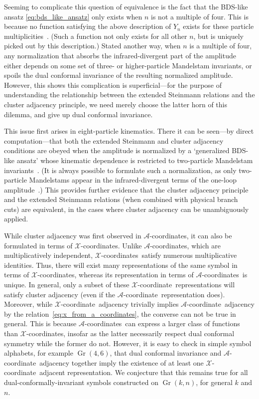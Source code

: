 \documentclass[12pt]{article}
\DeclareMathOperator{\Gr}{Gr}
\def\xcoord{$\mathcal{X}$-coordinate}
\def\xcoords{$\mathcal{X}$-coordinates}
\def\acoord{$\mathcal{A}$-coordinate}
\def\acoords{$\mathcal{A}$-coordinates}
\begin{document}
Seeming to complicate this question of equivalence is the fact that the BDS-like ansatz \eqref{eq:bds_like_ansatz} only exists when $n$ is not a multiple of four. This is because no function satisfying the above description of $Y_n$ exists for these particle multiplicities~\cite{Yang:2010az,Dixon:2016nkn}. (Such a function not only exists for all other $n$, but is uniquely picked out by this description.) Stated another way, when $n$ is a multiple of four, any normalization that absorbs the infrared-divergent part of the amplitude either depends on some set of three- or higher-particle Mandelstam invariants, or spoils the dual conformal invariance of the resulting normalized amplitude. However, this shows this complication is superficial---for the purpose of understanding the relationship between the extended Steinmann relations and the cluster adjacency principle, we need merely choose the latter horn of this dilemma, and give up dual conformal invariance. 

This issue first arises in eight-particle kinematics. There it can be seen---by direct computation---that both the extended Steinmann and cluster adjacency conditions are obeyed when the amplitude is normalized by a `generalized BDS-like ansatz' whose kinematic dependence is restricted to two-particle Mandelstam invariants~\cite{cluster_subalgebras_ii}. (It is always possible to formulate such a normalization, as only two-particle Mandelstams appear in the infrared-divergent terms of the one-loop amplitude~\cite{Bern:1994zx}.) This provides further evidence that the cluster adjacency principle and the extended Steinmann relations (when combined with physical branch cuts) are equivalent, in the cases where cluster adjacency can be unambiguously applied.

While cluster adjacency was first observed in \acoords, it can also be formulated in terms of \xcoords. Unlike \acoords, which are multiplicatively independent, \xcoords\ satisfy numerous multiplicative identities. Thus, there will exist many representations of the same symbol in terms of \xcoords, whereas its representation in terms of \acoords\ is unique. In general, only a subset of these \xcoord\ representations will satisfy cluster adjacency (even if the \acoord\ representation does). Moreover, while \xcoord\ adjacency trivially implies \acoord\ adjacency by the relation~\eqref{eq:x_from_a_coordinates}, the converse can not be true in general. This is because \acoords\ can express a larger class of functions than \xcoords, insofar as the latter necessarily respect dual conformal symmetry while the former do not. However, it is easy to check in simple symbol alphabets, for example $\Gr(4,6)$, that dual conformal invariance and \acoord\ adjacency together imply the existence of at least one \xcoord\ adjacent representation. We conjecture that this remains true for all dual-conformally-invariant symbols constructed on $\Gr(k,n)$, for general $k$ and $n$. 
\end{document}
